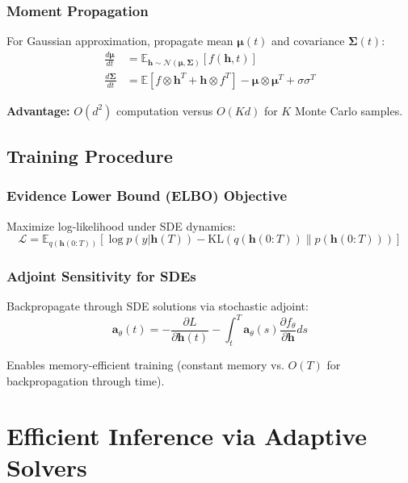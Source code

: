 \documentclass{article}
\begin{document}
\subsubsection{Moment Propagation}

For Gaussian approximation, propagate mean $\boldsymbol{\mu}(t)$ and covariance $\boldsymbol{\Sigma}(t)$:
\begin{align}
\frac{d\boldsymbol{\mu}}{dt} &= \mathbb{E}_{\mathbf{h} \sim \mathcal{N}(\boldsymbol{\mu}, \boldsymbol{\Sigma})}[f(\mathbf{h}, t)] \\
\frac{d\boldsymbol{\Sigma}}{dt} &= \mathbb{E}[f \otimes \mathbf{h}^T + \mathbf{h} \otimes f^T] - \boldsymbol{\mu} \otimes \boldsymbol{\mu}^T + \sigma \sigma^T
\end{align}

\textbf{Advantage:} $O(d^2)$ computation versus $O(Kd)$ for $K$ Monte Carlo samples.

\subsection{Training Procedure}

\subsubsection{Evidence Lower Bound (ELBO) Objective}

Maximize log-likelihood under SDE dynamics:
\begin{equation}
\mathcal{L} = \mathbb{E}_{q(\mathbf{h}(0:T))}\left[\log p(y | \mathbf{h}(T)) - \text{KL}(q(\mathbf{h}(0:T)) \| p(\mathbf{h}(0:T)))\right]
\end{equation}

\subsubsection{Adjoint Sensitivity for SDEs}

Backpropagate through SDE solutions via stochastic adjoint:
\begin{equation}
\mathbf{a}_\theta(t) = -\frac{\partial L}{\partial \mathbf{h}(t)} - \int_t^T \mathbf{a}_\theta(s) \frac{\partial f_\theta}{\partial \mathbf{h}} ds
\end{equation}

Enables memory-efficient training (constant memory vs. $O(T)$ for backpropagation through time).

\section{Efficient Inference via Adaptive Solvers}
\end{document}
